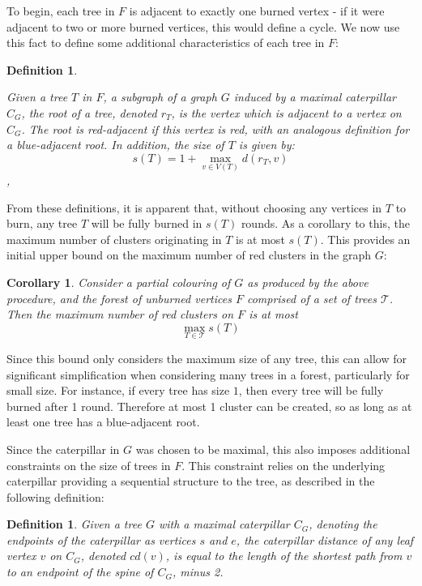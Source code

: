 \documentclass{mpaper}
\newtheorem{definition}[theorem]{Definition}
\newtheorem{corollary}[theorem]{Corollary}
\begin{document}
To begin, each tree in $F$ is adjacent to exactly one burned vertex - if it were adjacent to two or more burned vertices, this would define a cycle. We now use this fact to define some additional characteristics of each tree in $F$:

\begin{definition}
\label{def/roots}

Given a tree $T$ in $F$, a subgraph of a graph $G$ induced by a maximal caterpillar $C_G$, the \emph{root} of a tree, denoted $r_T$, is the vertex which is adjacent to a vertex on $C_G$. The root is \emph{red-adjacent} if this vertex is red, with an analogous definition for a \emph{blue-adjacent} root. In addition, the \emph{size} of $T$ is given by: $$s(T) = 1 + \max_{v \in V(T)} d(r_{T},v)$$, 
 

\end{definition}

From these definitions, it is apparent that, without choosing any vertices in $T$ to burn, any tree $T$ will be fully burned in $s(T)$ rounds. As a corollary to this, the maximum number of clusters originating in $T$ is at most $s(T)$. This provides an initial upper bound on the maximum number of red clusters in the graph $G$:

\begin{corollary}
\label{cor/root-diameter-bound-1}
Consider a partial colouring of $G$ as produced by the above procedure, and the forest of unburned vertices $F$ comprised of a set of trees $\mathcal{T}$. Then the maximum number of red clusters on $F$ is at most $$\max_{T \in \mathcal{T}} s(T)$$
\end{corollary}

Since this bound only considers the maximum size of any tree, this can allow for significant simplification when considering many trees in a forest, particularly for small size. For instance, if every tree has size $1$, then every tree will be fully burned after 1 round. Therefore at most 1 cluster can be created, so as long as at least one tree has a blue-adjacent root.

Since the caterpillar in $G$ was chosen to be maximal, this also imposes additional constraints on the size of trees in $F$. This constraint relies on the underlying caterpillar providing a sequential structure to the tree, as described in the following definition:

\begin{definition}
\label{def/tree-distance}
Given a tree $G$ with a maximal caterpillar $C_G$, denoting the endpoints of the caterpillar as vertices $s$ and $e$, the \emph{caterpillar distance} of any leaf vertex $v$ on $C_G$, denoted $cd(v)$, is equal to the length of the shortest path from $v$ to an endpoint of the spine of $C_G$, minus 2.
\end{definition}
\end{document}
